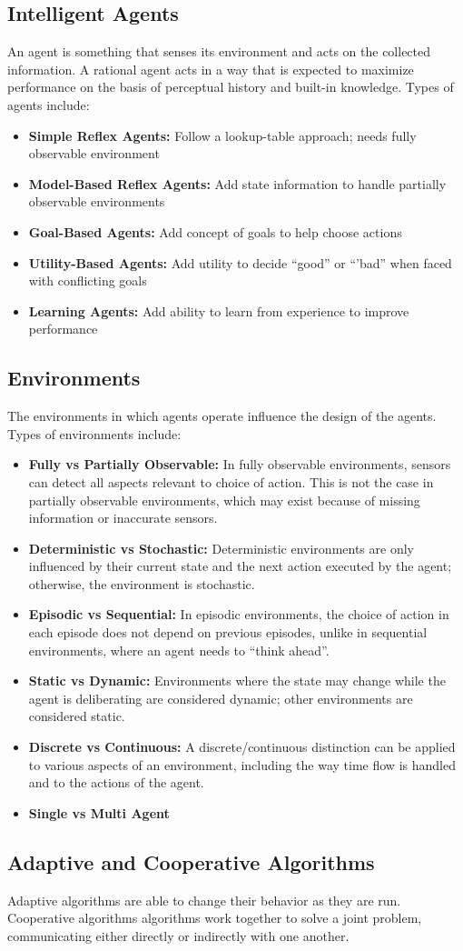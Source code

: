 \documentclass[12pt,titlepage]{article}
\begin{document}
    \subsection{Intelligent Agents}
      An agent is something that senses its environment and acts on the collected information. A rational agent acts in a way that is
      expected to maximize performance on the basis of perceptual history and built-in knowledge. Types of agents include:
      \begin{itemize}
        \item \textbf{Simple Reflex Agents:} Follow a lookup-table approach; needs fully observable environment
        \item \textbf{Model-Based Reflex Agents:} Add state information to handle partially observable environments
        \item \textbf{Goal-Based Agents:} Add concept of goals to help choose actions
        \item \textbf{Utility-Based Agents:} Add utility to decide ``good'' or ``'bad'' when faced with conflicting goals
        \item \textbf{Learning Agents:} Add ability to learn from experience to improve performance
      \end{itemize}

    \subsection{Environments}
      The environments in which agents operate influence the design of the agents. Types of environments include:
      \begin{itemize}
        \item \textbf{Fully vs Partially Observable:} In fully observable environments, sensors can detect all aspects
        relevant to choice of action. This is not the case in partially observable environments, which may exist because
        of missing information or inaccurate sensors.
        \item \textbf{Deterministic vs Stochastic:} Deterministic environments are only influenced by their current
        state and the next action executed by the agent; otherwise, the environment is stochastic.
        \item \textbf{Episodic vs Sequential:} In episodic environments, the choice of action in each episode does not
        depend on previous episodes, unlike in sequential environments, where an agent needs to ``think ahead''.
        \item \textbf{Static vs Dynamic:} Environments where the state may change while the agent is deliberating are
        considered dynamic; other environments are considered static.
        \item \textbf{Discrete vs Continuous:} A discrete/continuous distinction can be applied to various aspects of
        an environment, including the way time flow is handled and to the actions of the agent.
        \item \textbf{Single vs Multi Agent}
      \end{itemize}

    \subsection{Adaptive and Cooperative Algorithms}
      Adaptive algorithms are able to change their behavior as they are run. Cooperative algorithms algorithms work
      together to solve a joint problem, communicating either directly or indirectly with one another.
\end{document}
